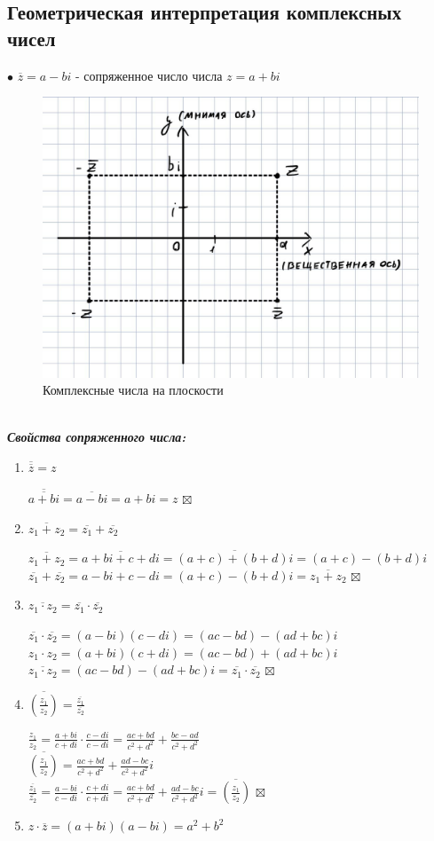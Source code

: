 \documentclass[a4paper, 12pt]{article}
\newenvironment{Proof}
{\par\noindent{$\blacklozenge$}}
{\hfill$\scriptstyle\boxtimes$}
\begin{document}
\subsection{Геометрическая интерпретация комплексных чисел}
$\bullet$ $\overline{z}=a-bi$ - сопряженное число числа $z=a+bi$\\
\begin{figure}[ht]
\centering
\includegraphics[width=0.5\linewidth]{pict1.jpg}
\caption{Комплексные числа на плоскости}
\label{fig:reg}
\end{figure}\\
\textit{\textbf{Свойства сопряженного числа:}}
\begin{enumerate}
    \item $\overline{\overline{z}}=z$
    \begin{Proof}
        $\overline{\overline{a+bi}} = \overline{a-bi} = a+bi = z$
    \end{Proof}
    \item $\overline{z_1+z_2} = \overline{z_1}+\overline{z_2}$
    \begin{Proof}
        $\overline{z_1+z_2}=\overline{a+bi+c+di}=\overline{(a+c)+(b+d)i} = (a+c)-(b+d)i$\\
        $\overline{z_1}+\overline{z_2}=a-bi+c-di=(a+c)-(b+d)i=\overline{z_1+z_2}$
    \end{Proof}
    \item $\overline{z_1 \cdot z_2}=\overline{z_1}\cdot\overline{z_2}$
    \begin{Proof}
        $\overline{z_1}\cdot\overline{z_2}=(a-bi)(c-di)=(ac-bd)-(ad+bc)i$\\
        $z_1\cdot z_2=(a+bi)(c+di)=(ac-bd)+(ad+bc)i$\\
        $\overline{z_1\cdot z_2} = (ac-bd)-(ad+bc)i = \overline{z_1}\cdot\overline{z_2}$
    \end{Proof}
    \item $\overline{(\frac{z_1}{z_2})} = \frac{\overline{z_1}}{\overline{z_2}}$
    \begin{Proof}
        $\frac{z_1}{z_2}=\frac{a+bi}{c+di}\cdot \frac{c-di}{c-di}=\frac{ac+bd}{c^2+d^2}+\frac{bc-ad}{c^2+d^2}$\\
        $\overline{(\frac{z_1}{z_2})}=\frac{ac+bd}{c^2+d^2}+\frac{ad-bc}{c^2+d^2}i$\\
        $\frac{\overline{z_1}}{\overline{z_2}}=\frac{a-bi}{c-di} \cdot \frac{c+di}{c+di} = \frac{ac+bd}{c^2+d^2}+\frac{ad-bc}{c^2+d^2}i = \overline{(\frac{z_1}{z_2})}$
    \end{Proof}
    \item $z\cdot \overline{z} = (a+bi)(a-bi)=a^2+b^2$
\end{enumerate}
\end{document}
